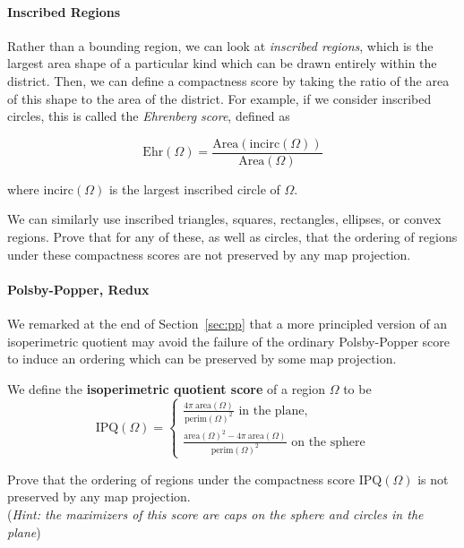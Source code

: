 \paragraph{Inscribed Regions}

Rather than a bounding region, we can look at \textit{inscribed regions}, which is the largest area shape of a particular kind which can be drawn entirely within the district.  Then, we can define a compactness score by taking the ratio of the area of this shape to the area of the district.  For example, if we consider inscribed circles, this is called the \textit{Ehrenberg score}, defined as

$$\mathrm{Ehr}(\Omega) = \frac{\mathrm{Area}(\mathrm{incirc}(\Omega))}{\mathrm{Area}(\Omega)}$$

where $\mathrm{incirc}(\Omega)$ is the largest inscribed circle of $\Omega$.

We can similarly use inscribed triangles, squares, rectangles, ellipses, or convex regions.  Prove that for any of these, as well as circles, that the ordering of regions under these compactness scores are not preserved by any map projection.



\paragraph{Polsby-Popper, Redux}
We remarked at the end of Section~\ref{sec:pp} that a more principled version of an isoperimetric quotient may avoid the failure of the ordinary Polsby-Popper score to induce an ordering which can be preserved by some map projection.

	We define the \textbf{isoperimetric quotient score} of a region $\Omega$ to be$$
	\mathrm{IPQ}(\Omega)=
	\begin{cases}
	\frac{4\pi \ \mathrm{area}(\Omega)}{\mathrm{perim}(\Omega)^2} \text{ in the plane},\\[10pt]
	\frac{\mathrm{area}(\Omega)^2 - 4\pi \ \mathrm{area}(\Omega)}{\mathrm{perim}(\Omega)^2}\text{ on the sphere}
	\end{cases}
	$$

Prove that the ordering of regions  under the compactness score $\mathrm{IPQ}(\Omega)$ is not preserved by any map projection.\\ (\textit{Hint: the maximizers of this score are caps on the sphere and circles in the plane})
	
	